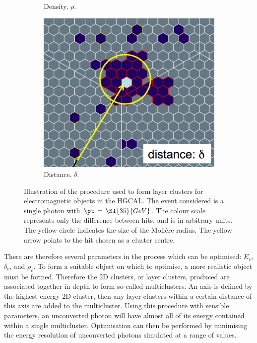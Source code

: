 \begin{figure}[h!]
\begin{subfigure}{0.292\textwidth}
    \caption{Density, $\rho$.}
  \end{subfigure}
  \begin{subfigure}{0.3\textwidth}
    \includegraphics[width=\textwidth]{Figures/HGCAL/ClusteringAlgo_Distance.png}
    \caption{Distance, $\delta$.}
  \end{subfigure}
  \caption{Illustration of the procedure used to form layer clusters for electromagnetic objects in the HGCAL.
  The event considered is a single photon with $\pt\,=\,\SI{35}{GeV}$.
  The colour scale represents only the difference between hits, and is in arbitrary units.
  The yellow circle indicates the size of the Moli\`ere radius.
  The yellow arrow points to the hit chosen as a cluster centre.}
  \label{fig:hgcal_clustering}
\end{figure}

There are therefore several parameters in the process which can be optimised: $E_c$, $\delta_c$, and $\rho_c$.
To form a suitable object on which to optimise, a more realistic object must be formed.
Therefore the 2D clusters, or layer clusters, produced are associated together in depth to form so-called multiclusters. 
An axis is defined by the highest energy 2D cluster, then any layer clusters within a certain distance of this axis are added to the multicluster.
Using this procedure with sensible parameters, an unconverted photon will have almost all of its energy contained within a single multicluster.
Optimisation can then be performed by minimising the energy resolution of unconverted photons simulated at a range of \pt values.

